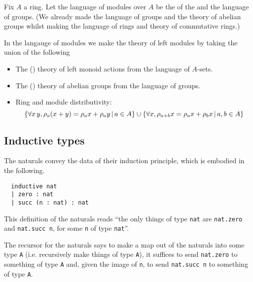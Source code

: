 \begin{dfn}[Modules]
  Fix $A$ a ring.
  Let the language of modules over $A$ be the 
  of the  and the language of groups.
  (We already made the language of groups and the theory of abelian groups
  whilst making the language of rings and theory of commutative rings.)

  In the langauge of modules we make the theory of left modules by taking the
  union of the following
  \begin{itemize}
    \item The () theory of left monoid actions
          from the language of $A$-sets.
    \item The () theory of abelian groups
          from the language of groups.
    \item Ring and module distributivity:
          \[
            \left\{ \forall x \, y, \rho_{a} (x + y) = \rho_{a} x + \rho_{a} y \,|\, a \in A \right\}
            \cup
            \left\{ \forall x, \rho_{a + b} x = \rho_{a} x + \rho_{b} x \,|\, a , b \in A \right\}
          \]
  \end{itemize}
\end{dfn}

\subsection{Inductive types}

\begin{dfn}

  The naturals convey the data of their induction principle,
  which is embodied in the following.

  \begin{lstlisting}
  inductive nat
  | zero : nat
  | succ (n : nat) : nat \end{lstlisting}
  This definition of the naturals reads
  ``the only things of type \texttt{nat} are
  \texttt{nat.zero} and \texttt{nat.succ n},
  for some \texttt{n} of type \texttt{nat}''.
\end{dfn}

The recursor for the naturals says to make a map out of the naturals
into some type \texttt{A} (i.e. recursively make things of type \texttt{A}),
it suffices to send \texttt{nat.zero} to something of type \texttt{A}
and, given the image of \texttt{n},
to send \texttt{nat.succ n} to something of type \texttt{A}.

